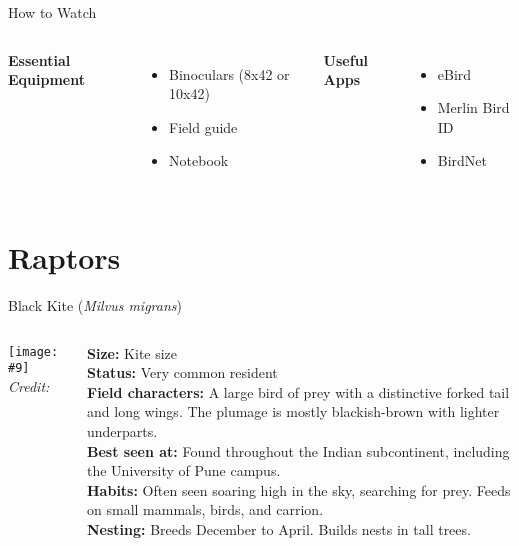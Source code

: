 \documentclass[aspectratio=169]{beamer}
\newcommand{\imagecredit}[1]{%
  \def\stripext##1.jpg{##1}%
  \edef\creditfile{\stripext#1_credit.txt}%
  {\scriptsize\em Credit: }%
}
\begin{document}
\begin{frame}{How to Watch}
    \begin{columns}[T]
        \textbf{Essential Equipment}
        \begin{itemize}
            \item Binoculars (8x42 or 10x42)
            \item Field guide
            \item Notebook
        \end{itemize}
        \textbf{Useful Apps}
        \begin{itemize}
            \item eBird
            \item Merlin Bird ID
            \item BirdNet
        \end{itemize}
    \end{columns}
\end{frame}

\newcommand{\birdslide}[9]{%
\begin{frame}{#1 (\textit{#2})}
    \begin{columns}[T]
        \column{0.5\textwidth}
        \texttt{[image: \#9]}
        \imagecredit{#9}
        \column{0.5\textwidth}
        \textbf{Size:} #3 \\
        \textbf{Status:} #4 \\[0.5em]
        \textbf{Field characters:} #5 \\[0.5em]
        \textbf{Best seen at:} #6 \\[0.5em]
        \textbf{Habits:} #7 \\[0.5em]
        \textbf{Nesting:} #8
    \end{columns}
\end{frame}
}

\section{Raptors}
\birdslide{Black Kite}{\textit{Milvus migrans}}
{Kite size}
{Very common resident}
{A large bird of prey with a distinctive forked tail and long wings. The plumage is mostly blackish-brown with lighter underparts.}
{Found throughout the Indian subcontinent, including the University of Pune campus.}
{Often seen soaring high in the sky, searching for prey. Feeds on small mammals, birds, and carrion.}
{Breeds December to April. Builds nests in tall trees.}
{black-kite.jpg}
\end{document}

